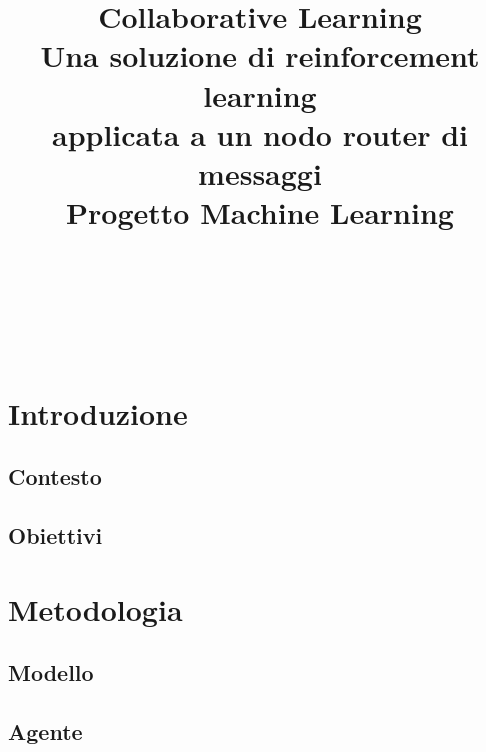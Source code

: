 \documentclass[conference]{IEEEtran}
\begin{document}
\let\subsectionautorefname\sectionautorefname
\let\subsubsectionautorefname\sectionautorefname
\title{Collaborative Learning\\ \large Una soluzione di reinforcement learning\\ applicata a un nodo router di messaggi\\
{\footnotesize Progetto Machine Learning}
}
\author{
 \\
\and
{}
 \\
\and
{}
 \\
}

\newcommand{\code}[1]{\texttt{#1}}

\maketitle

\begin{abstract}
\end{abstract}

\section{Introduzione}

\subsection{Contesto}

\subsection{Obiettivi}

\section{Metodologia}

\subsection{Modello}

\subsection{Agente}
\end{document}
